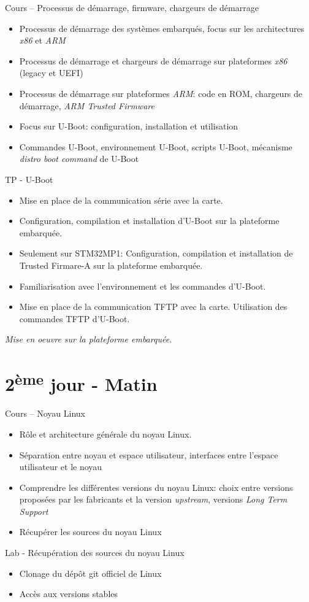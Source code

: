 \documentclass[a4paper,12pt,obeyspaces,spaces,hyphens]{article}
\begin{document}
\feagendatwocolumn
{Cours – Processus de démarrage, firmware, chargeurs de démarrage}
{
  \begin{itemize}
  \item Processus de démarrage des systèmes embarqués, focus sur les
    architectures {\em x86} et {\em ARM}
  \item Processus de démarrage et chargeurs de démarrage sur
    plateformes {\em x86} (legacy et UEFI)
  \item Processus de démarrage sur plateformes {\em ARM}: code en ROM,
    chargeurs de démarrage, {\em ARM Trusted Firmware}
  \item Focus sur U-Boot: configuration, installation et utilisation
  \item Commandes U-Boot, environnement U-Boot, scripts U-Boot,
    mécanisme {\em distro boot command} de U-Boot
  \end{itemize}
}
{TP - U-Boot}
{
  \begin{itemize}
  \item Mise en place de la communication série avec la carte.
  \item Configuration, compilation et installation d'U-Boot sur la
    plateforme embarquée.
  \item Seulement sur STM32MP1: Configuration, compilation et
    installation de Trusted Firmare-A sur la plateforme embarquée.
  \item Familiarisation avec l'environnement et les commandes
    d'U-Boot.
  \item Mise en place de la communication TFTP avec la carte.
    Utilisation des commandes TFTP d'U-Boot.
  \end{itemize}

  \vspace{0.5cm}
  {\em Mise en oeuvre sur la plateforme embarquée.}
}

\section{2\textsuperscript{ème} jour - Matin}

\feagendatwocolumn
{Cours – Noyau Linux}
{
  \begin{itemize}
  \item Rôle et architecture générale du noyau Linux.
  \item Séparation entre noyau et espace utilisateur, interfaces entre
    l'espace utilisateur et le noyau
  \item Comprendre les différentes versions du noyau Linux: choix
    entre versions proposées par les fabricants et la version {\em
      upstream}, versions {\em Long Term Support}
  \item Récupérer les sources du noyau Linux
  \end{itemize}
}
{Lab - Récupération des sources du noyau Linux}
{
  \begin{itemize}
  \item Clonage du dépôt git officiel de Linux
  \item Accès aux versions stables
  \end{itemize}
}
\end{document}
